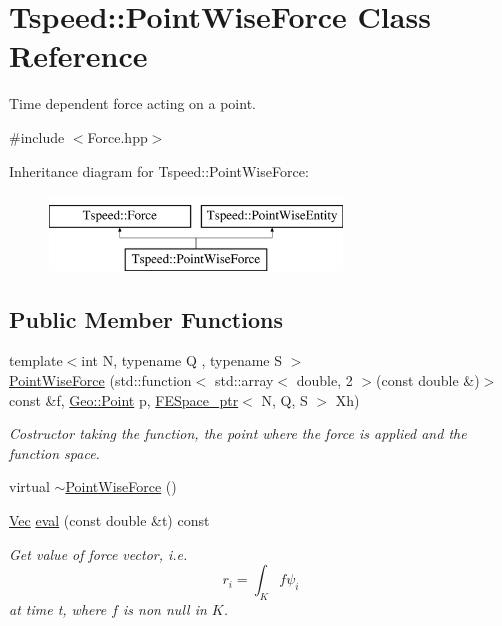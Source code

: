 \hypertarget{classTspeed_1_1PointWiseForce}{\section{Tspeed\-:\-:Point\-Wise\-Force Class Reference}
\label{classTspeed_1_1PointWiseForce}
}


Time dependent force acting on a point.  




{\ttfamily \#include $<$Force.\-hpp$>$}

Inheritance diagram for Tspeed\-:\-:Point\-Wise\-Force\-:\begin{figure}[H]
\begin{center}
\leavevmode
\includegraphics[height=2.000000cm]{classTspeed_1_1PointWiseForce}
\end{center}
\end{figure}
\subsection*{Public Member Functions}
\begin{DoxyCompactItemize}
\item 
{\footnotesize template$<$int N, typename Q , typename S $>$ }\\\hyperlink{classTspeed_1_1PointWiseForce_afbc52ae18411c6a212ed68812fd0fd36}{Point\-Wise\-Force} (std\-::function$<$ std\-::array$<$ double, 2 $>$(const double \&)$>$ const \&f, \hyperlink{classTspeed_1_1Geo_1_1Point}{Geo\-::\-Point} p, \hyperlink{namespaceTspeed_a05fcb57094666c8f5ab1e90d1a6fecf8}{F\-E\-Space\-\_\-ptr}$<$ N, Q, S $>$ Xh)
\begin{DoxyCompactList}\small\item\em Costructor taking the function, the point where the force is applied and the function space. \end{DoxyCompactList}\item 
virtual \hyperlink{classTspeed_1_1PointWiseForce_a34ad80033ed1e9d5ba31feffae4ab7c9}{$\sim$\-Point\-Wise\-Force} ()
\item 
\hyperlink{classTspeed_1_1Force_ab33d4f6bed9bf9a136afd1ac5a918c93}{Vec} \hyperlink{classTspeed_1_1PointWiseForce_a6689b6fa7289a81fc4feed63dafab143}{eval} (const double \&t) const 
\begin{DoxyCompactList}\small\item\em Get value of force vector, i.\-e. \[ r_i = \int_K f \psi_i \] at time t, where $f$ is non null in $K$. \end{DoxyCompactList}\end{DoxyCompactItemize}
